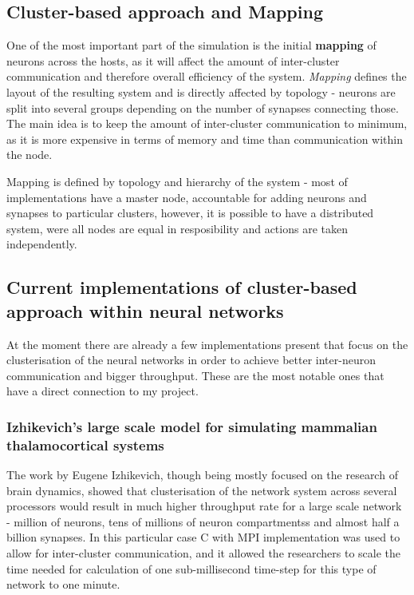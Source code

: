 \subsection{Cluster-based approach and Mapping}

One of the most important part of the simulation is the initial \textbf{mapping} of neurons across the hosts, as it will affect the amount of inter-cluster communication and therefore overall efficiency
of the system. \emph{Mapping} defines the layout of the resulting system and is directly affected by topology - neurons are split into several groups depending on the number of synapses connecting those.
The main idea is to keep the amount of inter-cluster communication to minimum, as it is more expensive in terms of memory and time than communication within the node.

Mapping is defined by topology and hierarchy of the system - most of implementations have a master node, accountable for adding neurons and synapses to particular clusters, however, it is
possible to have a distributed system, were all nodes are equal in resposibility and actions are taken independently.

\subsection{Current implementations of cluster-based approach within neural networks}
At the moment there are already a few implementations present that focus on the clusterisation of the neural networks in order to achieve better inter-neuron communication and bigger throughput. 
These are the most notable ones that have a direct connection to my project.

\subsubsection{Izhikevich's large scale model for simulating mammalian thalamocortical systems}
The work by Eugene Izhikevich, though being mostly focused on the research of brain dynamics, showed that clusterisation of the network system across several processors would result in much higher throughput rate for a large scale network - million of neurons, tens of millions of neuron compartmentss and almost half a billion synapses. In this particular case C with MPI implementation was used to allow for inter-cluster communication, and it allowed the researchers to scale the time needed for calculation of one sub-millisecond time-step for this type of network to one minute.\cite{EugeneM.Izhikevich2008}

